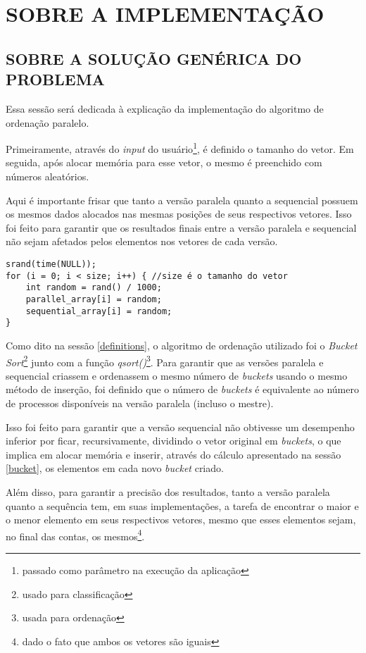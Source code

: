 \section{\normalsize SOBRE A IMPLEMENTAÇÃO}
	
	\subsection{\normalsize SOBRE A SOLUÇÃO GENÉRICA DO PROBLEMA}
	Essa sessão será dedicada à explicação da implementação do algoritmo de ordenação paralelo.
	
	Primeiramente, através do \textit{input} do usuário\footnote{passado como parâmetro na execução da aplicação}, é definido o tamanho do vetor. Em seguida, após alocar memória para esse vetor, o mesmo é preenchido com números aleatórios. 
	
	Aqui é importante frisar que tanto a versão paralela quanto a sequencial possuem os mesmos dados alocados nas mesmas posições de seus respectivos vetores. Isso foi feito para garantir que os resultados finais entre a versão paralela e sequencial não sejam afetados pelos elementos nos vetores de cada versão.
	
	\begin{lstlisting}[style=C]
srand(time(NULL));
for (i = 0; i < size; i++) { //size é o tamanho do vetor
	int random = rand() / 1000;
	parallel_array[i] = random;
	sequential_array[i] = random;
}
\end{lstlisting}
	
	Como dito na sessão \ref{definitions}, o algoritmo de ordenação utilizado foi o \textit{Bucket Sort}\footnote{usado para classificação} junto com a função \textit{qsort()}\footnote{usada para ordenação}. Para garantir que as versões paralela e sequencial criassem e ordenassem o mesmo número de \textit{buckets} usando o mesmo método de inserção, foi definido que o número de \textit{buckets} é equivalente ao número de processos disponíveis na versão paralela (incluso o mestre).
	
	Isso foi feito para garantir que a versão sequencial não obtivesse um desempenho inferior por ficar, recursivamente, dividindo o vetor original em \textit{buckets}, o que implica em alocar memória e inserir, através do cálculo apresentado na sessão \ref{bucket}, os elementos em cada novo \textit{bucket} criado.
		
	Além disso, para garantir a precisão dos resultados, tanto a versão paralela quanto a sequência tem, em suas implementações, a tarefa de encontrar o maior e o menor elemento em seus respectivos vetores, mesmo que esses elementos sejam, no final das contas, os mesmos\footnote{dado o fato que ambos os vetores são iguais}.
	

